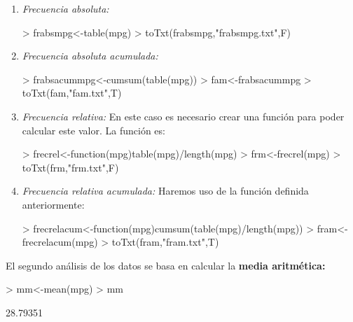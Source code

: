 \documentclass [a4paper] {article}
\begin{document}
\begin{enumerate}
\item
\textit{Frecuencia absoluta: }
\begin{Schunk}
\begin{Sinput}
> frabsmpg<-table(mpg)
> toTxt(frabsmpg,"frabsmpg.txt",F)
\end{Sinput}
\end{Schunk}

\item
\textit{Frecuencia absoluta acumulada: }
\begin{Schunk}
\begin{Sinput}
> frabsacummpg<-cumsum(table(mpg))
> fam<-frabsacummpg
> toTxt(fam,"fam.txt",T)
\end{Sinput}
\end{Schunk}

\item
\textit{Frecuencia relativa: }En este caso es necesario crear una funci\'on
para poder calcular este valor. La funci\'on es:
\begin{Schunk}
\begin{Sinput}
> frecrel<-function(mpg){table(mpg)/length(mpg)}
> frm<-frecrel(mpg)
> toTxt(frm,"frm.txt",F)
\end{Sinput}
\end{Schunk}

\item
\textit{Frecuencia relativa acumulada: }Haremos uso de la funci\'on definida anteriormente:
\begin{Schunk}
\begin{Sinput}
> frecrelacum<-function(mpg){cumsum(table(mpg)/length(mpg))}
> fram<-frecrelacum(mpg)
> toTxt(fram,"fram.txt",T)
\end{Sinput}
\end{Schunk}
\end{enumerate}

\bigskip
El segundo an\'alisis de los datos se basa en calcular la \textbf{media aritm\'etica:}
\begin{Schunk}
\begin{Sinput}
> mm<-mean(mpg)
> mm
\end{Sinput}
\begin{Soutput}
[1] 28.79351
\end{Soutput}
\end{Schunk}
\end{document}
